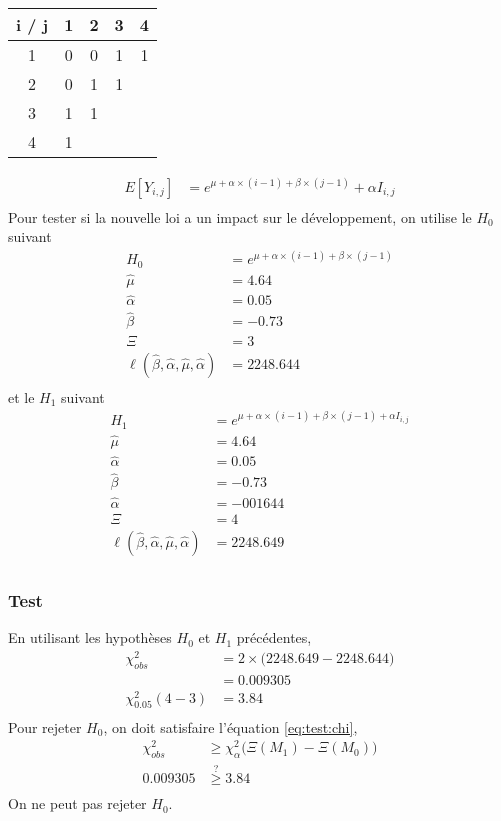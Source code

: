\documentclass[11pt,french]{report}
\begin{document}
\begin{itemize}
\begin{center}
\begin{tabular}{|c|c|c|c|c|}
  \hline
   i / j & 1 & 2 & 3 & 4\\ 
  \hline
  1 & 0 & 0 & 1 & 1  \\
  2 & 0 & 1 & 1 &  \\
  3 & 1 & 1 & &   \\
  4 & 1 &  &  &  \\
  \hline
\end{tabular}
\end{center}
\bigskip
\begin{align*}
E[Y_{i,j}] &= e^{\mu + \alpha\times(i-1) + \beta \times (j-1)} + \alpha I_{i,j} \\
\end{align*}
Pour tester si la nouvelle loi a un impact sur le développement, on utilise le $H_0$ suivant
\begin{align*}
H_0 &= e^{\mu + \alpha\times(i-1) + \beta \times (j-1)} \\
\widehat{\mu} &= 4.64 \\
\widehat{\alpha} &= 0.05 \\
\widehat{\beta} &= -0.73 \\
\Xi &= 3 \\
\ell(\widehat{\beta}, \widehat{\alpha}, \widehat{\mu}, \widehat{\alpha}) & = 2248.644 \\
\end{align*}
et le $H_1$ suivant
\begin{align*}
H_1 &= e^{\mu + \alpha\times(i-1) + \beta \times (j-1) + \alpha I_{i,j}} \\
\widehat{\mu} &= 4.64 \\
\widehat{\alpha} &= 0.05 \\
\widehat{\beta} &= -0.73 \\
\widehat{\alpha} &= -001644 \\
\Xi &= 4 \\
\ell(\widehat{\beta}, \widehat{\alpha}, \widehat{\mu}, \widehat{\alpha}) & = 2248.649 \\
\end{align*}
\subsubsection*{Test}
En utilisant les hypothèses $H_0$ et $H_1$ précédentes,
\begin{align*}
\chi_{obs}^2 &= 2 \times \Big( 2248.649-2248.644 \Big) \\
&= 0.009305 \\
\chi_{0.05}^2(4 - 3) &= 3.84 \\
\end{align*}
Pour rejeter $H_0$, on doit satisfaire l'équation \ref{eq:test:chi},
\begin{align*}
\chi_{obs}^2 &\geq \chi_{\alpha}^2\Big( \Xi (M_1) - \Xi (M_0) \Big) \\
0.009305 &\overset{?}{\geq} 3.84\\
\end{align*}
On ne peut pas rejeter $H_0$.
\bigskip
\end{itemize}
\end{document}
